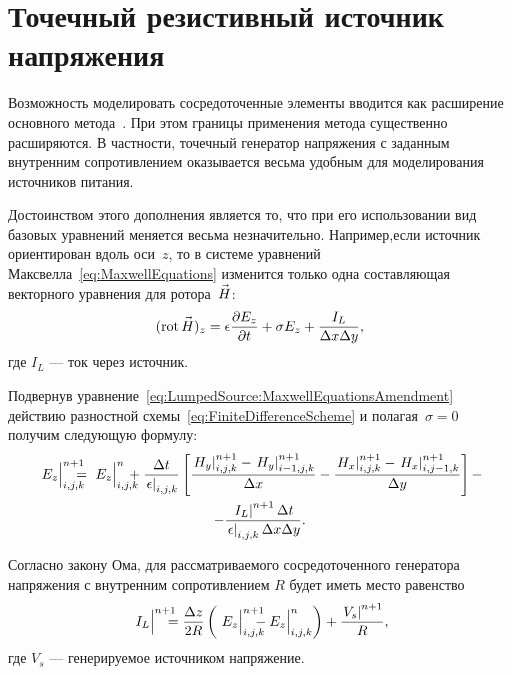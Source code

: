 %
%
%

\section{Точечный резистивный источник напряжения}
\label{div:LumpedSource}

Возможность моделировать сосредоточенные элементы вводится как расширение
основного метода~\cite{bib:Taflove1995,bib:Davidson2005,bib:PiketMay1994,
bib:Maloney1994}. При этом границы применения метода существенно расширяются.
В частности, точечный генератор напряжения с заданным внутренним сопротивлением
оказывается весьма удобным для моделирования источников питания.

Достоинством этого дополнения является то, что при его использовании вид базовых
уравнений меняется весьма незначительно. Например,если источник ориентирован
вдоль оси~$z$, то в системе уравнений Максвелла~\eqref{eq:MaxwellEquations}
изменится только одна составляющая векторного уравнения для ротора~$\vec{H\mathstrut}$:
\begin{equation}
    \label{eq:LumpedSource:MaxwellEquationsAmendment}
    (\operatorname{rot}\vec{H\mathstrut})_z = \epsilon\frac{\partial{E_z}}{\partial{t}} +
        \sigma E_z + \frac{I_L}{\Delta{x}\Delta{y}},
\end{equation}
где $I_L$ --- ток через источник.

Подвернув уравнение~\eqref{eq:LumpedSource:MaxwellEquationsAmendment} действию
разностной схемы~\eqref{eq:FiniteDifferenceScheme} и полагая~$\sigma=0$ получим
следующую формулу:
\begin{multline}
    \label{eq:LumpedSource:FdtdEquationsAmendmentWithI}
    \fYee{E_z}{n+1}{i,j,k} = \fYee{E_z}{n}{i,j,k} +
        \frac{\Delta{t}}{\yee{\epsilon}{}{i,j,k}}
        \left[
            \frac{\yee{H_y}{n+1}{i,j,k}-\yee{H_y}{n+1}{i-1,j,k}}{\Delta{x}} -
            \frac{\yee{H_x}{n+1}{i,j,k}-\yee{H_x}{n+1}{i,j-1,k}}{\Delta{y}}
        \right] - \\ -
        \frac{\yee{I_L}{n+1}{}\Delta{t}}
             {\yee{\epsilon}{}{i,j,k}\Delta{x}\Delta{y}}.
\end{multline}

Согласно закону Ома, для рассматриваемого сосредоточенного генератора напряжения
с внутренним сопротивлением $R$ будет иметь место равенство
\begin{equation}
    \label{eq:LumpedSource:OhmLaw}
    \fYee{I_L}{n+1}{} = \frac{\Delta{z}}{2R}
    \left(
        \fYee{E_z}{n+1}{i,j,k} - \Yee{E_z}{n}{i,j,k}
    \right) +
    \frac{\yee{V_s}{n+1}{}}{R},
\end{equation}
где $V_s$ --- генерируемое источником напряжение.

